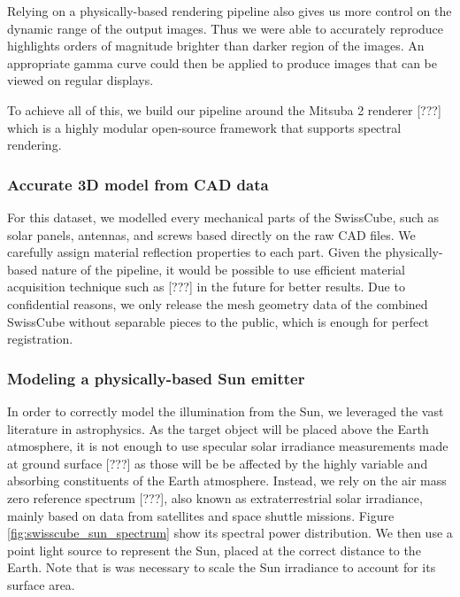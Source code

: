 Relying on a physically-based rendering pipeline also gives us more control on the dynamic range of the output images. Thus we were able to accurately reproduce highlights orders of magnitude brighter than darker region of the images. An appropriate gamma curve could then be applied to produce images that can be viewed on regular displays.

To achieve all of this, we build our pipeline around the Mitsuba 2 renderer [???] which is a highly modular open-source framework that supports spectral rendering.


\subsubsection{Accurate 3D model from CAD data}

For this dataset, we modelled every mechanical parts of the SwissCube, such as solar panels, antennas, and screws based directly on the raw CAD files. We carefully assign material reflection properties to each part. Given the physically-based nature of the pipeline, it would be possible to use efficient material acquisition technique such as [???] in the future for better results. Due to confidential reasons, we only release the mesh geometry data of the combined SwissCube without separable pieces to the public, which is enough for perfect registration.



\subsubsection{Modeling a physically-based Sun emitter}

In order to correctly model the illumination from the Sun, we leveraged the vast literature in astrophysics. As the target object will be placed above the Earth atmosphere, it is not enough to use specular solar irradiance measurements made at ground surface [???] as those will be be affected by the highly variable and absorbing constituents of the Earth atmosphere. Instead, we rely on the air mass zero reference spectrum [???], also known as extraterrestrial solar irradiance, mainly based on data from satellites and space shuttle missions. Figure \ref{fig:swisscube_sun_spectrum} show its spectral power distribution. We then use a point light source to represent the Sun, placed at the correct distance to the Earth. Note that is was necessary to scale the Sun irradiance to account for its surface area.


